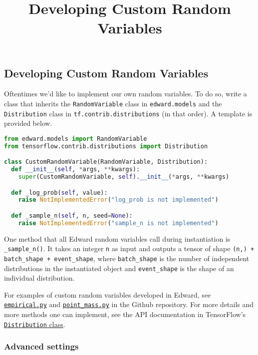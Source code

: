 \title{Developing Custom Random Variables}

\subsection{Developing Custom Random Variables}

Oftentimes we'd like to implement our own random variables.
To do so, write a class that inherits
the \texttt{RandomVariable} class in \texttt{edward.models} and
the \texttt{Distribution} class in \texttt{tf.contrib.distributions} (in that
order). A template is provided below.

\begin{lstlisting}[language=Python]
from edward.models import RandomVariable
from tensorflow.contrib.distributions import Distribution

class CustomRandomVariable(RandomVariable, Distribution):
  def __init__(self, *args, **kwargs):
    super(CustomRandomVariable, self).__init__(*args, **kwargs)

  def _log_prob(self, value):
    raise NotImplementedError("log_prob is not implemented")

  def _sample_n(self, n, seed=None):
    raise NotImplementedError("sample_n is not implemented")
\end{lstlisting}

One method that all Edward random variables call during instantiation is
\texttt{_sample_n()}.
It takes an integer \texttt{n} as input and outputs a tensor of shape
\texttt{(n,) + batch_shape + event_shape}, where \texttt{batch_shape}
is the number of independent distributions in the instantiated object
and \texttt{event_shape} is the shape of an individual distribution.

For examples of custom random variables developed in Edward, see
\href{https://github.com/blei-lab/edward/blob/master/edward/models/empirical.py}{\texttt{empirical.py}}
and
\href{https://github.com/blei-lab/edward/blob/master/edward/models/point_mass.py}{\texttt{point_mass.py}}
in the Github repository.
For more details and more methods one can implement, see the API
documentation in TensorFlow's
\href{https://www.tensorflow.org/api_docs/python/tf/contrib/distributions/Distribution}{\texttt{Distribution} class}.

\subsubsection{Advanced settings}

